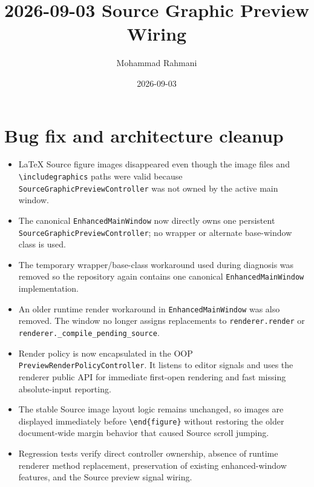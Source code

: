 \documentclass[a4paper]{article}
\title{2026-09-03 Source Graphic Preview Wiring}
\date{2026-09-03}
\author{Mohammad Rahmani}
\begin{document}
   \maketitle

   \section{Bug fix and architecture cleanup}
   \begin{itemize}
      \item LaTeX Source figure images disappeared even though the image files and \verb|\includegraphics| paths were valid because \texttt{SourceGraphicPreviewController} was not owned by the active main window.
      \item The canonical \texttt{EnhancedMainWindow} now directly owns one persistent \texttt{SourceGraphicPreviewController}; no wrapper or alternate base-window class is used.
      \item The temporary wrapper/base-class workaround used during diagnosis was removed so the repository again contains one canonical \texttt{EnhancedMainWindow} implementation.
      \item An older runtime render workaround in \texttt{EnhancedMainWindow} was also removed. The window no longer assigns replacements to \texttt{renderer.render} or \texttt{renderer.\_compile\_pending\_source}.
      \item Render policy is now encapsulated in the OOP \texttt{PreviewRenderPolicyController}. It listens to editor signals and uses the renderer public API for immediate first-open rendering and fast missing absolute-input reporting.
      \item The stable Source image layout logic remains unchanged, so images are displayed immediately before \verb|\end{figure}| without restoring the older document-wide margin behavior that caused Source scroll jumping.
      \item Regression tests verify direct controller ownership, absence of runtime renderer method replacement, preservation of existing enhanced-window features, and the Source preview signal wiring.
   \end{itemize}

   
   
\end{document}
